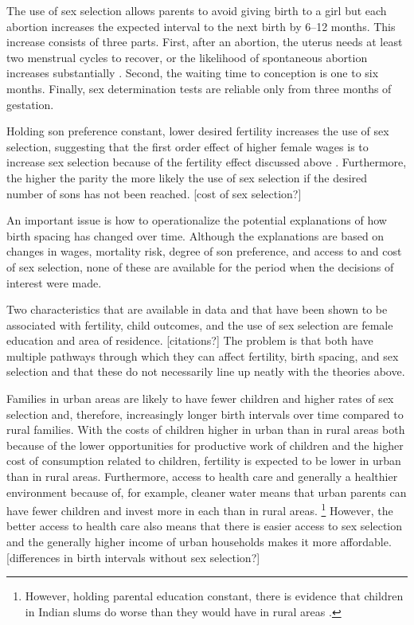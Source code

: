 The use of sex selection allows parents to avoid giving birth to a girl but each
abortion increases the expected interval to the next birth by 6--12 months.
This increase consists of three parts. 
First, after an abortion, the uterus needs at least two menstrual cycles to recover, 
or the likelihood of spontaneous abortion increases substantially \citep{zhou00b}. 
Second, the waiting time to conception is one to six months. 
Finally, sex determination tests are reliable only from three months of gestation. 

Holding son preference constant, lower desired fertility increases the use of sex 
selection, suggesting that the first order effect of higher female wages is to increase 
sex selection because of the fertility effect discussed above \citep{Portner2015b,Jayachandran2017}.  
Furthermore, the higher the parity the more likely the use of sex selection if the 
desired number of sons has not been reached.
[cost of sex selection?]


An important issue is how to operationalize the potential explanations of how 
birth spacing has changed over time.
Although the explanations are based on changes in wages, mortality risk, degree of son 
preference, and access to and cost of sex selection, none of these are available for the 
period when the decisions of interest were made.

Two characteristics that are available in data and that have been shown to be associated 
with fertility, child outcomes, and the use of sex selection are female education and 
area of residence.
[citations?]
The problem is that both have multiple pathways through which they can affect fertility,
birth spacing, and sex selection and that these do not necessarily line up neatly with the
theories above.


Families in urban areas are likely to have fewer children and higher rates of sex 
selection and, therefore, increasingly longer birth intervals over time compared to
rural families.
With the costs of children higher in urban than in rural areas both because of the
lower opportunities for productive work of children and the higher cost of consumption
related to children, fertility is expected to be lower in urban than in rural areas.
Furthermore, access to health care and generally a healthier environment because of,
for example, cleaner water means that urban parents can have fewer children and invest
more in each than in rural areas.%
\footnote{
However, holding parental education constant, there is evidence that children in
Indian slums do worse than they would have in rural areas \citep{Portner2018a}.
}
However, the better access to health care also means that there is easier access to
sex selection and the generally higher income of urban households makes it more
affordable.
[differences in birth intervals without sex selection?]


